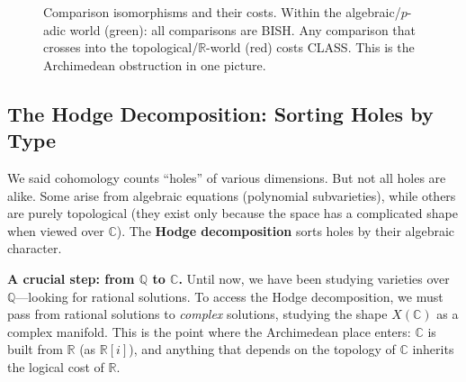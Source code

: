 \documentclass[11pt,twoside,openany]{report}
\theoremstyle{remark}
\newcommand{\BISH}{\textsf{BISH}}
\newcommand{\CLASS}{\textsf{CLASS}}
\begin{document}
\begin{figure}[htbp]
\centering
{}
\caption{Comparison isomorphisms and their costs. Within the algebraic/$p$-adic world (green): all comparisons are \BISH. Any comparison that crosses into the topological/$\mathbb{R}$-world (red) costs \CLASS. This is the Archimedean obstruction in one picture.}
\label{fig:comparison-costs}
\end{figure}

\subsection*{The Hodge Decomposition: Sorting Holes by Type}

We said cohomology counts ``holes'' of various dimensions. But not all holes are alike. Some arise from algebraic equations (polynomial subvarieties), while others are purely topological (they exist only because the space has a complicated shape when viewed over $\mathbb{C}$). The \textbf{Hodge decomposition} sorts holes by their algebraic character.

\textbf{A crucial step: from $\mathbb{Q}$ to $\mathbb{C}$.} Until now, we have been studying varieties over $\mathbb{Q}$---looking for rational solutions. To access the Hodge decomposition, we must pass from rational solutions to \emph{complex} solutions, studying the shape $X(\mathbb{C})$ as a complex manifold. This is the point where the Archimedean place enters: $\mathbb{C}$ is built from $\mathbb{R}$ (as $\mathbb{R}[i]$), and anything that depends on the topology of $\mathbb{C}$ inherits the logical cost of $\mathbb{R}$.
\end{document}
